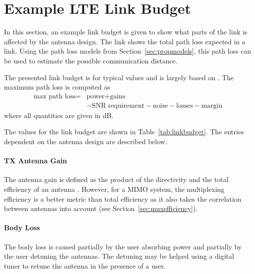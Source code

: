 \section{Example LTE Link Budget}
\begin{aautop}
In this section, an example link budget is given to show what parts of the link is affected by the antenna design. The link shows the total path loss expected in a link. Using the path loss models from Section~\ref{sec:propmodels}, this path loss can be used to estimate the possible communication distance.
\end{aautop}

The presented link budget is for typical values and is largely based on \cite{holma2011lte}. The maximum path loss is computed as
\begin{equation}
    \label{eq:linkbudget}
    \begin{aligned}
        \text{max path loss} =& \text{power} + \text{gains}\\
        &- \text{SNR requirement} - \text{noise} - \text{losses} - \text{margin}
    \end{aligned}
\end{equation}
where all quantities are given in dB. 

The values for the link budget are shown in Table~\ref{tab:linkbudget}. The entries dependent on the antenna design are described below.

\paragraph{TX Antenna Gain} The antenna gain is defined as the product of the directivity and the total efficiency of an antenna \cite{balanis2012antenna}. However, for a MIMO system, the multiplexing efficiency is a better metric than total efficiency as it also takes the correlation between antennas into account (see Section~\ref{sec:muxefficiency}). %
	
\paragraph{Body Loss} The body loss is caused partially by the user absorbing power and partially by the user detuning the antennas. The detuning may be helped using a digital tuner to retune the antenna in the presence of a user.


